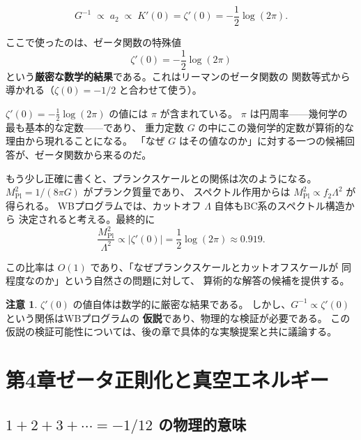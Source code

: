 \documentclass[11pt,a4paper]{article}
\theoremstyle{definition}
\newtheorem{rmk}[thm]{注意}
\begin{document}
\begin{keybox}[$G$ の算術的起源]
\[
  G^{-1} \;\propto\; a_2 \;\propto\; K'(0) = \zeta'(0)
        = -\frac{1}{2}\log(2\pi).
\]
\end{keybox}

\noindent ここで使ったのは、ゼータ関数の特殊値
\[
  \zeta'(0) = -\frac{1}{2}\log(2\pi)
\]
という\textbf{厳密な数学的結果}である。これはリーマンのゼータ関数の
関数等式から導かれる（$\zeta(0) = -1/2$ と合わせて使う）。

\begin{hsbox}
$\zeta'(0) = -\frac{1}{2}\log(2\pi)$ の値には $\pi$ が含まれている。
$\pi$ は円周率——幾何学の最も基本的な定数——であり、
重力定数 $G$ の中にこの幾何学的定数が算術的な理由から現れることになる。
「なぜ $G$ はその値なのか」に対する一つの候補回答が、ゼータ関数から来るのだ。
\end{hsbox}

もう少し正確に書くと、プランクスケールとの関係は次のようになる。
$M_{\mathrm{Pl}}^2 = 1/(8\pi G)$ がプランク質量であり、
スペクトル作用からは $M_{\mathrm{Pl}}^2 \propto f_2\Lambda^2$ が得られる。
WBプログラムでは、カットオフ $\Lambda$ 自体もBC系のスペクトル構造から
決定されると考える。最終的に
\[
  \frac{M_{\mathrm{Pl}}^2}{\Lambda^2} \propto |\zeta'(0)| = \frac{1}{2}\log(2\pi)
  \approx 0.919.
\]

この比率は $O(1)$ であり、「なぜプランクスケールとカットオフスケールが
同程度なのか」という自然さの問題に対して、
算術的な解答の候補を提供する。

\begin{rmk}
$\zeta'(0)$ の値自体は数学的に厳密な結果である。
しかし、$G^{-1} \propto \zeta'(0)$ という関係はWBプログラムの
\textbf{仮説}であり、物理的な検証が必要である。
この仮説の検証可能性については、後の章で具体的な実験提案と共に議論する。
\end{rmk}


\chapter*{第4章\quad ゼータ正則化と真空エネルギー}
\setcounter{section}{0}
\renewcommand{\thesection}{4.\arabic{section}}

\section{$1+2+3+\cdots = -1/12$ の物理的意味}
\label{sec:4.1}
\end{document}
